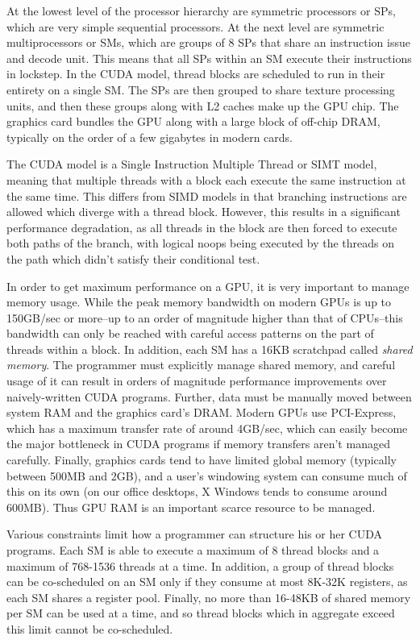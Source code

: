 \documentclass[preprint]{sigplanconf}
\begin{document}
At the lowest level of the processor hierarchy are symmetric
processors or SPs, which are very simple sequential processors.  At the
next level are symmetric multiprocessors or SMs, which are groups of 8 SPs that
share an instruction issue and decode unit.  This means that all SPs within an
SM execute their instructions in lockstep.  In the CUDA model, thread blocks are
scheduled to run in their entirety on a single SM.  The SPs are then grouped to
share texture processing units, and then these groups along with L2 caches make
up the GPU chip.  The graphics card bundles the GPU along with a large block of
off-chip DRAM, typically on the order of a few gigabytes in modern cards.

The CUDA model is a Single Instruction Multiple Thread or SIMT model, meaning
that multiple threads with a block each execute the same instruction at the same
time.  This differs from SIMD models in that branching instructions are allowed
which diverge with a thread block.  However, this results in a significant
performance degradation, as all threads in the block are then forced to execute
both paths of the branch, with logical noops being executed by the threads on
the path which didn't satisfy their conditional test.

In order to get maximum performance on a GPU, it is very important to manage
memory usage.  While the peak memory bandwidth on modern GPUs is up to 150GB/sec
or more--up to an order of magnitude higher than that of CPUs--this bandwidth
can only be reached with careful access patterns on the part of threads within a
block.  In addition, each SM has a 16KB scratchpad called {\it shared memory}.
The programmer must explicitly manage shared memory, and careful usage of it can
result in orders of magnitude performance improvements over naively-written CUDA
programs.  Further, data must be manually moved between system RAM and the
graphics card's DRAM.  Modern GPUs use PCI-Express, which has a maximum transfer
rate of around 4GB/sec, which can easily become the major bottleneck in CUDA
programs if memory transfers aren't managed carefully.  Finally, graphics cards
tend to have limited global memory (typically between 500MB and 2GB), and a
user's windowing system can consume much of this on its own (on our office
desktops, X Windows tends to consume around 600MB).  Thus GPU RAM is an
important scarce resource to be managed.

Various constraints limit how a programmer can structure his or her CUDA
programs.  Each SM is able to execute a maximum of 8 thread blocks and
a maximum of 768-1536 threads at a time.  In addition, a group of thread blocks
can be co-scheduled on an SM only if they consume at most 8K-32K registers, as
each SM shares a register pool.  Finally, no more than 16-48KB of shared
memory per SM can be used at a time, and so thread blocks which in aggregate
exceed this limit cannot be co-scheduled.
\end{document}
